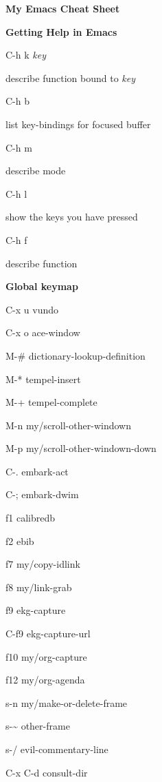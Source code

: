\documentclass[10pt]{article}
\renewcommand\section[1]{\bigskip\par\textbf{\color{heading}\large#1}\smallskip}
\newcommand\humanreadable[1]{{\par\color{default}\small\sffamily#1}}
\newcommand\meta[1]{\textlangle\textit{#1}\textrangle}
\begin{document}
\author{Jousimies}
\begin{multicols}{4}

  \setlength{\columnsep}{1cm}
  \begin{center}
    \LARGE\color{heading}\textbf{My Emacs Cheat Sheet}
  \end{center}

  \section{Getting Help in Emacs}
  \begin{keylist}
    \item[C-h k \meta{key}] \humanreadable{describe function bound to \meta{key}}
    \item[C-h b] \humanreadable{list key-bindings for focused buffer}
    \item[C-h m] \humanreadable{describe mode}
    \item[C-h l] \humanreadable{show the keys you have pressed}
    \item[C-h f] \humanreadable{describe function}
  \end{keylist}

  \section{Global keymap}
  \begin{keylist}
    \item[C-x u] vundo
    \item[C-x o] ace-window
    \item[M-\#] dictionary-lookup-definition
    \item[M-*] tempel-insert
    \item[M-+] tempel-complete
    \item[M-n] my/scroll-other-windown
    \item[M-p] my/scroll-other-windown-down
    \item[C-.] embark-act
    \item[C-;] embark-dwim
    \item[f1] calibredb
    \item[f2] ebib
    \item[f7] my/copy-idlink
    \item[f8] my/link-grab
    \item[f9] ekg-capture
    \item[C-f9] ekg-capture-url
    \item[f10] my/org-capture
    \item[f12] my/org-agenda
    \item[s-n] my/make-or-delete-frame
    \item[s-\~] other-frame
    \item[s-/] evil-commentary-line
    \item[C-x C-d] consult-dir
  \end{keylist}

\end{multicols}
\end{document}
